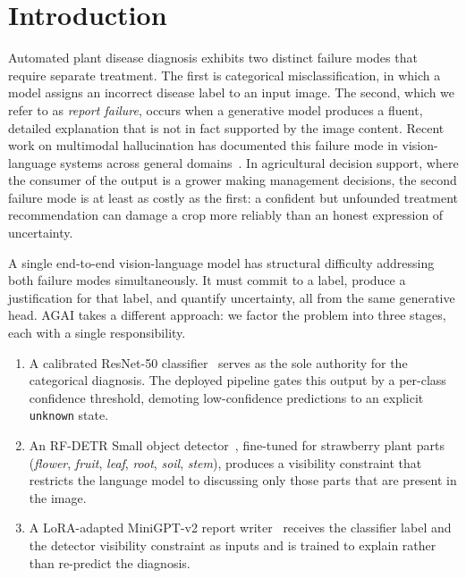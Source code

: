 \section{Introduction}

Automated plant disease diagnosis exhibits two distinct failure modes that
require separate treatment. The first is categorical misclassification, in
which a model assigns an incorrect disease label to an input image. The
second, which we refer to as \emph{report failure}, occurs when a generative
model produces a fluent, detailed explanation that is not in fact supported
by the image content. Recent work on multimodal hallucination has documented
this failure mode in vision-language systems across general
domains~\citep{huang2024hallucinationsurvey}. In agricultural decision
support, where the consumer of the output is a grower making management
decisions, the second failure mode is at least as costly as the first: a
confident but unfounded treatment recommendation can damage a crop more
reliably than an honest expression of uncertainty.

A single end-to-end vision-language model has structural difficulty
addressing both failure modes simultaneously. It must commit to a label,
produce a justification for that label, and quantify uncertainty, all from
the same generative head. AGAI takes a different approach: we factor the
problem into three stages, each with a single responsibility.

\begin{enumerate}[leftmargin=1.3em]
    \item A calibrated ResNet-50 classifier~\citep{he2016resnet,guo2017calibration}
    serves as the sole authority for the categorical diagnosis. The
    deployed pipeline gates this output by a per-class confidence
    threshold, demoting low-confidence predictions to an explicit
    \texttt{unknown} state.
    \item An RF-DETR Small object detector~\citep{robinson2025rfdetr,carion2020detr},
    fine-tuned for strawberry plant parts (\emph{flower}, \emph{fruit},
    \emph{leaf}, \emph{root}, \emph{soil}, \emph{stem}), produces a
    visibility constraint that restricts the language model to discussing
    only those parts that are present in the image.
    \item A LoRA-adapted MiniGPT-v2 report writer~\citep{chen2023minigptv2,hu2021lora,touvron2023llama2}
    receives the classifier label and the detector visibility constraint
    as inputs and is trained to explain rather than re-predict the
    diagnosis.
\end{enumerate}

